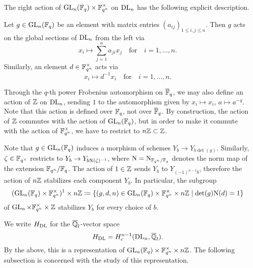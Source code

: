 \documentclass[../main.tex]{subfiles}
\begin{document}
The right action of $\operatorname{GL}_n(\mathbb{F}_q) \times \mathbb{F}_{q^n}^\times$ on $\mathrm{DL}_n$ has the following
explicit description.

\begin{lem}\label{lem:ActionsOnDLn}
  Let $g \in \operatorname{GL}_n(\mathbb{F}_q)$ be an element with matrix entries $(a_{ij})_{1 \leq
  i,j \leq n}$. Then $g$ acts on the global sections of $\mathrm{DL}_n$ from the left via
  \begin{equation*}
    x_i  \mapsto  \sum_{j = 1}^n a_{ji}x_j \quad \text{for} \quad i = 1, \dots, n. 
  \end{equation*}
  Similarly, an element $d \in \mathbb{F}_{q^n}^\times$ acts via
  \begin{equation*}
    x_i \mapsto d^{-1} x_i \quad \text{for} \quad i = 1, \dots, n.
  \end{equation*}
\end{lem}

Through the $q$-th power Frobenius automorphism on $\overline {\mathbb{F}}_q$, we may also
define an action of $\mathbb{Z}$ on $\mathrm{DL}_n$, sending $1$ to the automorphism given by
$x_i \mapsto x_i$, $a \mapsto a^{-q}$. Note that this action is defined over 
$\mathbb{F}_q$, not over $\overline {\mathbb{F}}_q$. 
By construction, the action of $\mathbb{Z}$ commutes with the action of $\operatorname{GL}_n(\mathbb{F}_q)$, 
but in order to make it commute with the action of $\mathbb{F}_{q^n}^\times$, we 
have to restrict to $n\mathbb{Z} \subset \mathbb{Z}$. 

Note that $g \in \operatorname{GL}_n(\mathbb{F}_q)$ induces a morphism of schemes
$Y_b \to Y_{b \det(g)}$. Similarly, $\zeta \in \mathbb{F}_{q^\times}$ 
restricts to $Y_b \to Y_{b \mathrm{N}(\zeta)^{-1}}$, where $\mathrm{N} = \mathrm{N}_{\mathbb{F}_{q^n}/\mathbb{F}_q}$
denotes the norm map of the extension $\mathbb{F}_{q^n}/\mathbb{F}_q$. The action of 
$1 \in \mathbb{Z}$ sends $Y_b$ to $Y_{(-1)^{n-1} b}$, therefore the action of 
$n\mathbb{Z}$ stabilizes each component $Y_b$. In particular, 
the subgroup 
\begin{equation*}
  (\operatorname{GL}_n(\mathbb{F}_q) \times \mathbb{F}_{q^n}^\times)^1 \times n\mathbb{Z} 
  \coloneq \{(g,d,n) \in \operatorname{GL}_n(\mathbb{F}_q) \times \mathbb{F}_{q^n}^\times \times n\mathbb{Z} 
  \mid \det(g) \mathrm{N}(d) = 1\}
\end{equation*}
of $\operatorname{GL}_n \times \mathbb{F}_{q^n}^\times \times \mathbb{Z}$
stabilizes $Y_b$ for every choice of $b$.

We write $H_{\mathrm{DL}}$ for the $\overline {\mathbb{Q}}_l$-vector space
\begin{equation*}
  H_{\mathrm{DL}} = H_c^{n-1}(\mathrm{DL}_n, \overline {\mathbb{Q}}_l).
\end{equation*}
By the above, this is a representation of $\operatorname{GL}_n(\mathbb{F}_q) \times \mathbb{F}_{q^n}^\times
\times n\mathbb{Z}$. The following subsection is concerned with the study of this
representation.
\end{document}
